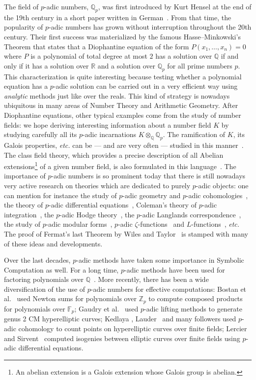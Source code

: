 \documentclass[11pt]{article}
\numberwithin{equation}{section}
\numberwithin{figure}{section}
\theoremstyle{definition}
\newcommand{\Z}{\mathbb Z}
\newcommand{\Zp}{\Z_p}
\newcommand{\Q}{\mathbb Q}
\newcommand{\Qp}{\Q_p}
\newcommand{\F}{\mathbb F}
\newcommand{\Fp}{\F_p}
\newcommand{\R}{\mathbb R}
\begin{document}
The field of $p$-adic numbers, $\Qp$, was first introduced by 
Kurt Hensel at the end of the 19th century in a short paper written in 
German~\cite{He97}. From that time, the popularity of $p$-adic numbers 
has grown without interruption throughout the 20th century. Their first 
success was materialized by the famous Hasse--Minkowski's Theorem 
\cite{Se70} that 
states that a Diophantine equation of the form $P(x_1, \ldots, x_n) = 0$ 
where $P$ is a polynomial of total degree at most $2$ has a solution over $\Q$ 
if and only if it has a solution over $\R$ and a solution over $\Qp$ for 
all prime numbers $p$. This characterization is quite interesting because 
testing whether a polynomial equation has a $p$-adic solution can be 
carried out in a very efficient way using \emph{analytic} methods just 
like over the reals.
This kind of strategy is nowadays ubiquitous in many areas of Number 
Theory and Arithmetic Geometry. After Diophantine equations, other 
typical examples come from the study of number fields: we hope deriving 
interesting information about a number field $K$ by studying carefully
all its $p$-adic incarnations $K \otimes_\Q \Qp$. The ramification of
$K$, its Galois properties, \emph{etc.} can be --- and are very often 
--- studied in this manner~\cite{Sa72,Ne99}.
The class field theory, which provides a precise description of all
Abelian extensions\footnote{An abelian extension is a Galois extension
whose Galois group is abelian.} of a given number field, is also 
formulated in this language~\cite{Ne12}.
The importance of $p$-adic numbers is so prominent today that there is 
still nowadays very active research on theories which are dedicated to 
purely $p$-adic objects: one can mention for instance the
study of $p$-adic geometry and $p$-adic cohomologies~\cite{BO78,LS07},
the theory of $p$-adic differential equations~\cite{Ke10}, Coleman's theory 
of $p$-adic integration~\cite{Co98}, the $p$-adic Hodge theory~\cite{BrCo09}, 
the $p$-adic Langlands correspondence~\cite{Be11}, the study of $p$-adic 
modular forms~\cite{Go88}, $p$-adic $\zeta$-functions~\cite{Ko84} and 
$L$-functions~\cite{Co89}, \emph{etc.} The proof of Fermat's last 
Theorem by Wiles and Taylor~\cite{Wi95,TaWi95} is stamped with many of 
these ideas and developments.

Over the last decades, $p$-adic methods have taken some importance in 
Symbolic Computation as well. For a long time, $p$-adic methods have 
been used for factoring polynomials over $\Q$~\cite{LeLeLo82}. More recently, 
there has been a wide diversification of the use of $p$-adic numbers for 
effective computations: Bostan et al.~\cite{BoGoPeSc05} used Newton sums 
for polynomials over $\Zp$ to compute composed products for polynomials 
over $\Fp$; Gaudry et al.~\cite{GaHoWeRiKo06} used $p$-adic lifting 
methods to generate genus 2 CM hyperelliptic curves; Kedlaya 
\cite{Ke01}, Lauder~\cite{La04} and many followers used $p$-adic 
cohomology to count points on hyperelliptic curves over finite fields; 
Lercier and Sirvent~\cite{LeSi08} computed isogenies between elliptic 
curves over finite fields using $p$-adic differential equations. 
\end{document}
